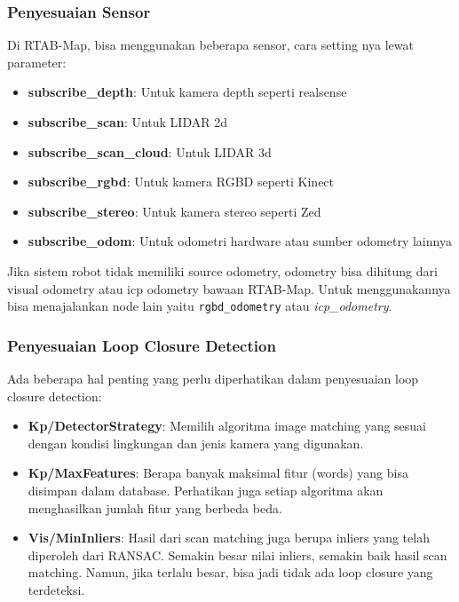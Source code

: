 \documentclass{article}
\begin{document}
\subsubsection{Penyesuaian Sensor}
  Di RTAB-Map, bisa menggunakan beberapa sensor, cara setting nya lewat parameter:
  \begin{itemize}
    \item \textbf{subscribe\_depth}: Untuk kamera depth seperti realsense 
    \item \textbf{subscribe\_scan}: Untuk LIDAR 2d 
    \item \textbf{subscribe\_scan\_cloud}: Untuk LIDAR 3d
    \item \textbf{subscribe\_rgbd}: Untuk kamera RGBD seperti Kinect
    \item \textbf{subscribe\_stereo}: Untuk kamera stereo seperti Zed
    \item \textbf{subscribe\_odom}: Untuk odometri hardware atau sumber odometry lainnya
  \end{itemize}
  Jika sistem robot tidak memiliki source odometry, odometry bisa dihitung dari visual odometry atau icp odometry bawaan RTAB-Map. Untuk menggunakannya bisa menajalankan node lain yaitu \texttt{rgbd\_odometry} atau \textit{icp\_odometry}. 

\subsubsection{Penyesuaian Loop Closure Detection}
Ada beberapa hal penting yang perlu diperhatikan dalam penyesuaian loop closure detection:
\begin{itemize}
  \item \textbf{Kp/DetectorStrategy}: Memilih algoritma image matching yang sesuai dengan kondisi lingkungan dan jenis kamera yang digunakan. 
  \item \textbf{Kp/MaxFeatures}: Berapa banyak maksimal fitur (words) yang bisa disimpan dalam database. Perhatikan juga setiap algoritma akan menghasilkan jumlah fitur yang berbeda beda.
  \item \textbf{Vis/MinInliers}: Hasil dari scan matching juga berupa inliers yang telah diperoleh dari RANSAC. Semakin besar nilai inliers, semakin baik hasil scan matching. Namun, jika terlalu besar, bisa jadi tidak ada loop closure yang terdeteksi. 
\end{itemize}
\end{document}
